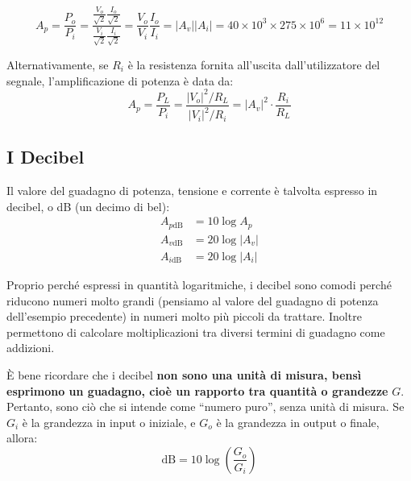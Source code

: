 \documentclass[openany,a4paper,12pt]{book}
\begin{document}
\begin{minipage}{0.45\textwidth}
    \begin{equation*}
        A_p = \frac{P_o}{P_i} = \frac{\displaystyle \frac{V_o}{\sqrt{2}} \frac{I_o}{\sqrt{2}}}{\displaystyle \frac{V_i}{\sqrt{2}} \frac{I_i}{\sqrt{2}}} = \frac{V_o}{V_i} \frac{I_o}{I_i} = |A_v||A_i| = 40 \times 10^3 \times 275 \times 10^6 = 11 \times 10^{12}
    \end{equation*}
\end{minipage}
\vspace{0.5cm}

Alternativamente, se $R_i$ è la resistenza fornita all'uscita dall'utilizzatore del segnale, l'amplificazione di potenza è data da:
\begin{equation*}
    A_p = \frac{P_L}{P_i} = \frac{|V_o|^2 / R_L}{|V_i|^2 / R_i} = |A_v|^2 \cdot \frac{R_i}{R_L}
\end{equation*}


\subsection{I Decibel}

Il valore del guadagno di potenza, tensione e corrente è talvolta espresso in decibel, o dB (un decimo di bel):
\begin{align}
    A_{p\text{dB}} &= 10 \log A_p \\
    A_{v\text{dB}} &= 20 \log |A_v| \\
    A_{i\text{dB}} &= 20 \log |A_i|
\end{align}

Proprio perché espressi in quantità logaritmiche, i decibel sono comodi perché riducono numeri molto grandi (pensiamo al valore del guadagno di potenza dell'esempio precedente) in numeri molto più piccoli da trattare. Inoltre permettono di calcolare moltiplicazioni tra diversi termini di guadagno come addizioni.

È bene ricordare che i decibel \textbf{non sono una unità di misura, bensì esprimono un guadagno, cioè un rapporto tra quantità o grandezze} $G$. Pertanto, sono ciò che si intende come ``numero puro'', senza unità di misura. Se $G_i$ è la grandezza in input o iniziale, e $G_o$ è la grandezza in output o finale, allora:
\begin{equation}
    \text{dB} = 10 \log \left(\frac{G_o}{G_i}\right)
\end{equation}
\end{document}
